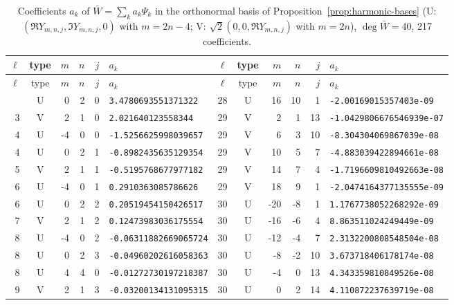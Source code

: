 \begin{longtable}{rcrrrl|rcrrrl}
\caption{Coefficients $a_k$ of $\bar W=\sum_k a_k\Psi_k$ in the orthonormal basis of Proposition~\ref{prop:harmonic-bases} (U: $(\Re Y_{m,n,j},\Im Y_{m,n,j},0)$ with $m=2n-4$; V: $\sqrt2(0,0,\Re Y_{m,n,j})$ with $m=2n$), $\deg\bar W=40$, 217 coefficients.}\label{tab:coefficients}\\
\toprule
$\ell$ & type & $m$ & $n$ & $j$ & $a_k$ & $\ell$ & type & $m$ & $n$ & $j$ & $a_k$\\
\midrule
\endfirsthead
\toprule
$\ell$ & type & $m$ & $n$ & $j$ & $a_k$ & $\ell$ & type & $m$ & $n$ & $j$ & $a_k$\\
\midrule
\endhead
\bottomrule
\endfoot
2 & U & 0 & 2 & 0 & \texttt{3.4780693551371322} & 28 & U & 16 & 10 & 1 & \texttt{-2.00169015357403e-09}\\
3 & V & 2 & 1 & 0 & \texttt{2.021640123558344} & 29 & V & 2 & 1 & 13 & \texttt{-1.0429806676546939e-07}\\
4 & U & -4 & 0 & 0 & \texttt{-1.5256625998039657} & 29 & V & 6 & 3 & 10 & \texttt{-8.304304069867039e-08}\\
4 & U & 0 & 2 & 1 & \texttt{-0.8982435635129354} & 29 & V & 10 & 5 & 7 & \texttt{-4.883039422894661e-08}\\
5 & V & 2 & 1 & 1 & \texttt{-0.5195768677977182} & 29 & V & 14 & 7 & 4 & \texttt{-1.7196609810492663e-08}\\
6 & U & -4 & 0 & 1 & \texttt{0.2910363085786626} & 29 & V & 18 & 9 & 1 & \texttt{-2.0474164377135555e-09}\\
6 & U & 0 & 2 & 2 & \texttt{0.20519454150426517} & 30 & U & -20 & -8 & 1 & \texttt{1.1767738052268292e-09}\\
7 & V & 2 & 1 & 2 & \texttt{0.12473983036175554} & 30 & U & -16 & -6 & 4 & \texttt{8.863511024249449e-09}\\
8 & U & -4 & 0 & 2 & \texttt{-0.06311882669065724} & 30 & U & -12 & -4 & 7 & \texttt{2.3132200808548504e-08}\\
8 & U & 0 & 2 & 3 & \texttt{-0.04960202616058363} & 30 & U & -8 & -2 & 10 & \texttt{3.673718406178174e-08}\\
8 & U & 4 & 4 & 0 & \texttt{-0.01272730197218387} & 30 & U & -4 & 0 & 13 & \texttt{4.343359810849526e-08}\\
9 & V & 2 & 1 & 3 & \texttt{-0.03200134131095315} & 30 & U & 0 & 2 & 14 & \texttt{4.110872237639719e-08}\\

\end{longtable}
